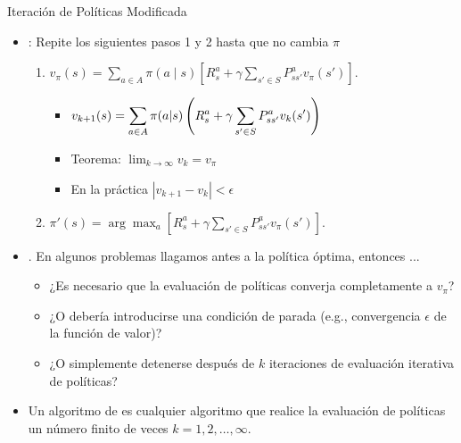\documentclass[10pt, envcountsect, handout, aspectratio=1610, hyperref={hypertexnames=true}]{beamer}
\begin{document}
\begin{frame}{Iteración de Políticas Modificada}
\begin{itemize}
	\item {}: Repite los siguientes pasos 1 y 2 hasta que no cambia $\pi$
		\begin{enumerate}
			\item {}
			$
			v_\pi(s) = \sum_{a \in A} \pi(a \mid s) \left[ R^a_s + \gamma \sum_{s' \in S} P^a_{ss'} v_\pi(s') \right].
			$
			
			\begin{itemize}
				\item $\displaystyle v_{k+1}(s) = \sum_{a \in A} \pi(a|s) \left(R^a_s + \gamma \sum_{s' \in S} P^a_{ss'} v_k(s')\right)$
				\item Teorema: $\lim_{k\rightarrow \infty} v_k = v_\pi$
				\item En la práctica $|v_{k+1}-v_{k}|<\epsilon$
			\end{itemize}
				
			\item {} 
			\(
			\pi'(s) = \arg\max_a \left[ R^a_s + \gamma \sum_{s' \in S} P^a_{ss'} v_\pi(s') \right].
			\)
			
		\end{enumerate}
		
	\item {}. En algunos problemas llagamos antes a la política óptima, entonces ...
	\begin{itemize}
	    \item ¿Es necesario que la evaluación de políticas converja completamente a $v_\pi$?
	    \item ¿O debería introducirse una condición de parada (e.g., convergencia $\epsilon$ de la función de valor)?
	    \item ¿O simplemente detenerse después de $k$ iteraciones de evaluación iterativa de políticas?
	\end{itemize}
	
	\item Un algoritmo de  \citep{puterman1978modified} es cualquier algoritmo que realice la evaluación de políticas un número finito de veces $k=1, 2, \ldots, \infty$.
\end{itemize}
\end{frame}
\end{document}
